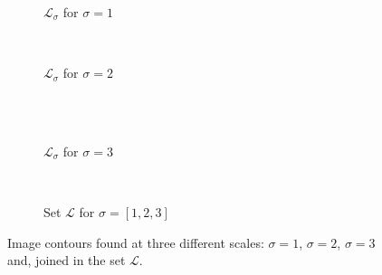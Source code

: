 \begin{figure}[!ht]
    \centering
    \begin{subfigure}[b]{0.45\textwidth}
        \caption{$\mathcal{L}_{\sigma}$ for $\sigma=1$}
        \label{fig:cnts_scale1}
    \end{subfigure}
    ~ %
    \begin{subfigure}[b]{0.45\textwidth}
        \caption{$\mathcal{L}_{\sigma}$ for $\sigma=2$}
        \label{fig:cnts_scale2}
    \end{subfigure}\\
        ~ %
    \begin{subfigure}[b]{0.45\textwidth}
        \caption{$\mathcal{L}_{\sigma}$ for $\sigma=3$}
        \label{fig:cnts_scale3}
    \end{subfigure}
        ~ %
    \begin{subfigure}[b]{0.45\textwidth}
        \caption{Set $\mathcal{L}$ for $\sigma=[1, 2 ,3]$}
        \label{fig:all_cnts}
    \end{subfigure}
    \caption{Image contours found at three different scales:  $\sigma=1$,  $\sigma=2$,  $\sigma=3$ and,  joined in the set $\mathcal{L}$.}\label{fig:multiscale_cnts}
\end{figure}

